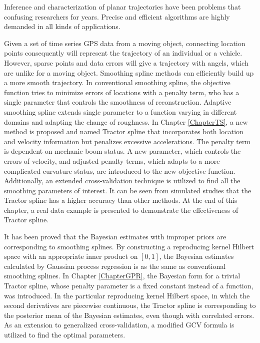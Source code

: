 
Inference and characterization of planar trajectories have been problems that confusing researchers for years. Precise and efficient algorithms are highly demanded in all kinds of applications. 

Given a set of time series GPS data from a moving object, connecting location points consequently will represent the trajectory of an individual or a vehicle. However, sparse points and data errors will give a trajectory with angels, which are unlike for a moving object. Smoothing spline methods can efficiently build up a more smooth trajectory. In conventional smoothing spline, the objective function tries to minimize errors of locations with a penalty term, who has a single parameter that controls the smoothness of reconstruction. Adaptive smoothing spline extends single parameter to a function varying in different domains and adapting the change of roughness. In Chapter \ref{ChapterTS}, a new method is proposed and named Tractor spline that incorporates both location and velocity information but penalizes excessive accelerations. The penalty term is dependent on mechanic boom status. A new parameter, which controls the errors of velocity, and adjusted penalty terms, which adapts to a more complicated curvature status, are introduced to the new objective function. Additionally, an extended cross-validation technique is utilized to find all the smoothing parameters of interest. It can be seen from simulated studies that the Tractor spline has a higher accuracy than other methods. At the end of this chapter, a real data example is presented to demonstrate the effectiveness of Tractor spline.


It has been proved that the Bayesian estimates with improper priors are corresponding to smoothing splines. By constructing a reproducing kernel Hilbert space with an appropriate inner product on $[0,1]$, the Bayesian estimates calculated by Gaussian process regression is as the same as conventional smoothing splines. In Chapter \ref{ChapterGPR}, the Bayesian form for a trivial Tractor spline, whose penalty parameter is a fixed constant instead of a function, was introduced. In the particular reproducing kernel Hilbert space, in which the second derivatives are piecewise continuous, the Tractor spline is corresponding to the posterior mean of the Bayesian estimates, even though with correlated errors. As an extension to generalized cross-validation, a modified GCV formula is utilized to find the optimal parameters. 


